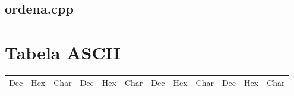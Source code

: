 \documentclass{book}
\begin{document}

\section{ordena.cpp}





\appendix
\chapter{Tabela ASCII}

{\tt\small

\begin{tabular}{|lll|lll|lll|lll|}

  Dec &   Hex & Char &  Dec &   Hex & Char &  Dec &   Hex & Char &  Dec &   Hex & Char \\


\end{tabular}}
\end{document}
